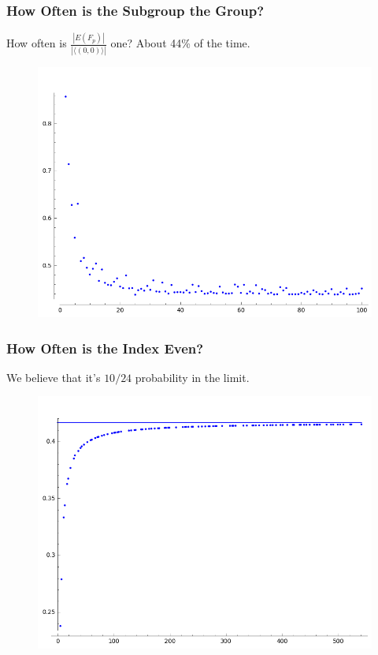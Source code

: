 \documentclass{beamer}
\begin{document}
\begin{frame}
\frametitle{How Often is the Subgroup the Group?}
How often is $\frac{|E(F_p)|}{|\langle (0,0) \rangle|}$ one? About 44\% of the time.
\begin{figure}[H]
\centering
\includegraphics[width=.8\textwidth]{surjectivity_probability}
\end{figure}
\end{frame}

\begin{frame}
\frametitle{How Often is the Index Even?}
We believe that it's $10/24$ probability in the limit. 
\begin{figure}[H]
\centering
\includegraphics[width=.8\textwidth]{divisibility_two}
\end{figure}
\end{frame}
\end{document}
